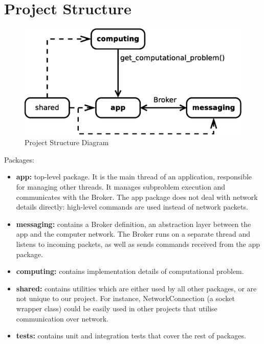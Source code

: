 \documentclass{article}
\begin{document}
\section{Project Structure}
\begin{figure}[H]
	\centering
	\includegraphics[width=\linewidth]{diagrams/ProjectStructure.eps}
	\caption{Project Structure Diagram}
\end{figure}

Packages:
\begin{itemize}
    \item \textbf{app:} top-level package. It is the main thread of an application, responsible for managing other threads. It manages subproblem execution and communicates with the Broker. 
    The app package does not deal with network details directly: high-level commands are used instead of network packets.
    \item \textbf{messaging:} contains a Broker definition, an abstraction layer between the app and the computer network. 
    The Broker runs on a separate thread and listens to incoming packets, as well as sends commands received from the app package.
    \item \textbf{computing:} contains implementation details of computational problem.
    \item \textbf{shared:} contains utilities which are either used by all other packages, or are not unique to our project. 
    For instance, NetworkConnection (a socket wrapper class) could be easily used in other projects that utilise communication over network.
    \item \textbf{tests:} contains unit and integration tests that cover the rest of packages.
\end{itemize}
\end{document}
